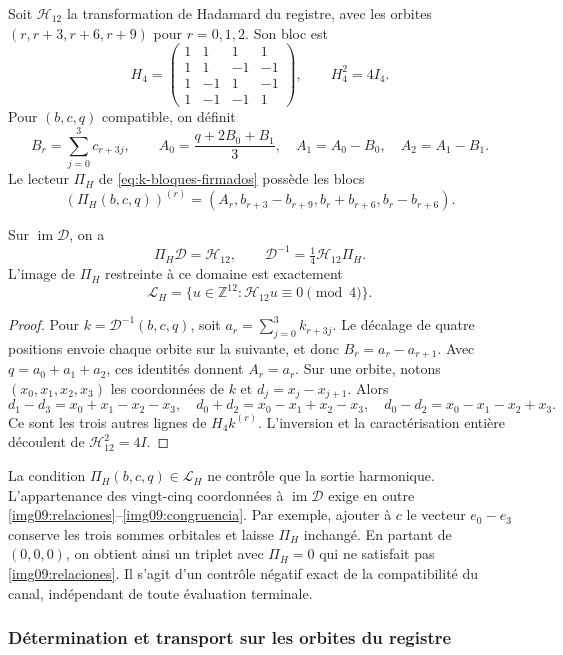 Soit $\mathcal H_{12}$ la transformation de Hadamard du registre,
avec les orbites $(r,r+3,r+6,r+9)$ pour $r=0,1,2$. Son bloc est
\[
 H_4=\begin{pmatrix}
 1&1&1&1\\1&1&-1&-1\\1&-1&1&-1\\1&-1&-1&1
 \end{pmatrix},\qquad H_4^2=4I_4.
\]
Pour $(b,c,q)$ compatible, on définit
\[
 B_r=\sum_{j=0}^3c_{r+3j},\qquad
 A_0=\frac{q+2B_0+B_1}{3},\quad A_1=A_0-B_0,
 \quad A_2=A_1-B_1.
\]
Le lecteur $\Pi_H$ de \eqref{eq:k-bloques-firmados} possède les blocs
\[
 (\Pi_H(b,c,q))^{(r)}=
 (A_r,b_{r+3}-b_{r+9},b_r+b_{r+6},b_r-b_{r+6}).
\]

\begin{proposition}
\label{img09:triangulo}
Sur $\operatorname{im}\mathcal D$, on a
\[
 \Pi_H\mathcal D=\mathcal H_{12},\qquad
 \mathcal D^{-1}=\tfrac14\mathcal H_{12}\Pi_H.
\]
L'image de $\Pi_H$ restreinte à ce domaine est exactement
\[
 \mathcal L_H=
 \{u\in\mathbb Z^{12}:\mathcal H_{12}u\equiv0\pmod4\}.
\]
\end{proposition}
\begin{proof}
Pour $k=\mathcal D^{-1}(b,c,q)$, soit
$a_r=\sum_{j=0}^3k_{r+3j}$. Le décalage de quatre positions
envoie chaque orbite sur la suivante, et donc $B_r=a_r-a_{r+1}$.
Avec $q=a_0+a_1+a_2$, ces identités donnent $A_r=a_r$.
Sur une orbite, notons $(x_0,x_1,x_2,x_3)$ les coordonnées
de $k$ et $d_j=x_j-x_{j+1}$. Alors
\[
 d_1-d_3=x_0+x_1-x_2-x_3,\quad
 d_0+d_2=x_0-x_1+x_2-x_3,\quad
 d_0-d_2=x_0-x_1-x_2+x_3.
\]
Ce sont les trois autres lignes de $H_4k^{(r)}$. L'inversion et la
caractérisation entière découlent de $\mathcal H_{12}^2=4I$.
\end{proof}

La condition $\Pi_H(b,c,q)\in\mathcal L_H$ ne contrôle que la
sortie harmonique. L'appartenance des vingt-cinq coordonnées à
$\operatorname{im}\mathcal D$ exige en outre
\eqref{img09:relaciones}--\eqref{img09:congruencia}.
Par exemple, ajouter à $c$ le vecteur $e_0-e_3$ conserve les trois sommes
orbitales et laisse $\Pi_H$ inchangé. En partant de $(0,0,0)$, on
obtient ainsi un triplet avec $\Pi_H=0$ qui ne satisfait pas
\eqref{img09:relaciones}. Il s'agit d'un contrôle négatif exact de la
compatibilité du canal, indépendant de toute évaluation terminale.

\subsubsection{Détermination et transport sur les orbites du registre}

